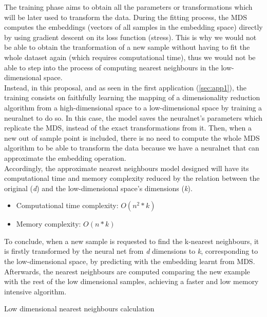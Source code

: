 \documentclass[a4paper,11pt,spanish]{report}
\makeatletter
\def\BState{\State\hskip-\ALG@thistlm}
\makeatother
\begin{document}
The training phase aims to obtain all the parameters or transformations which will be later used to transform the data. During the fitting process, the MDS computes the embeddings (vectors of all samples in the embedding space) directly by using gradient descent on its loss function (stress). This is why we would not be able to obtain the tranformation of a new sample without having to fit the whole dataset again (which requires computational time), thus we would not be able to step into the process of computing nearest neighbours in the low-dimensional space.\\
Instead, in this proposal, and as seen in the first application (\ref{sec:app1}), the training consists on faithfully learning the mapping of a dimensionality reduction algorithm from a high-dimensional space to a low-dimensional space by training a neuralnet to do so. In this case, the model saves the neuralnet's parameters which replicate the MDS, instead of the exact transformations from it. Then, when a new out of sample point is included, there is no need to compute the whole MDS algorithm to be able to transform the data because we have a neuralnet that can approximate the embedding operation.\\
Accordingly, the approximate nearest neighbours model designed will have its computational time and memory complexity reduced by the relation between the original (\textit{d}) and the low-dimensional space's dimensions (\textit{k}).
\begin{itemize}
\item Computational time complexity: $O(n^{2}*k)$
\item Memory complexity: $O(n*k)$
\end{itemize}

To conclude, when a new sample is requested to find the k-nearest neighbours, it is firstly transformed by the neural net from \textit{d} dimensions to \textit{k}, corresponding to the low-dimensional space, by predicting with the embedding learnt from MDS. Afterwards, the nearest neighbours are computed comparing the new example with the rest of the low  dimensional samples, achieving a faster and low memory intensive algorithm.\\

\begin{algorithm}
\caption{Low dimensional nearest neighbours calculation}
\end{algorithm}
\hfill
\end{document}
